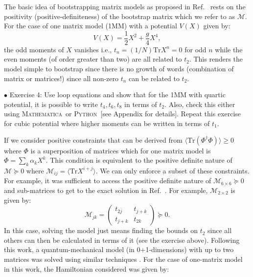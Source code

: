 \documentclass[letter,11pt]{article}
\newcommand{\MA}{\textsc{Mathematica}}
\newcommand{\PY}{\textsc{Python}}
\begin{document}
The basic idea of bootstrapping matrix models as proposed in Ref.~\cite{Lin:2020mme} rests on the 
positivity (positive-definiteness) of the bootstrap matrix which we refer to as $\mathcal{M}$. 
For the case of one matrix model (1MM) with a potential $V(X)$ given by: 
\begin{equation}
    V(X) = \frac12 X^2 + \frac{g}{4} X^4, 
\end{equation}
the odd moments of $X$ vanishes i.e., $ t_{n} = (1/N)\mbox{Tr} X^n = 0$ for odd $n$
while the even moments (of order greater than two) are all related to $t_{2}$. This renders the 
model simple to bootstrap since there is no growth of words (combination of matrix or matrices!)
since all non-zero $t_{n}$ can be related to $t_{2}$. 
\begin{mdframed}[backgroundcolor=blue!3] 
	$\bullet$ Exercise 4: Use loop equations and show that for the 1MM with quartic potential, it is possible to write $t_{4}, t_{6}, t_{8}$ in terms of $t_{2}$. Also, check this either using \MA~or  \PY~[see Appendix for details]. 
Repeat this exercise for cubic potential where higher moments can be written in terms of $t_1$.  
\end{mdframed} 
If we consider positive constraints that can be derived from $\langle \mbox{Tr}(\Phi^{\dagger}\Phi) \rangle \ge 0 $
where $\Phi$ is a superposition of matrices which for one matrix model is 
$ \Phi = \sum_{k} \alpha_{k} X^{k}$. This condition is equivalent to the positive definite nature of
$\mathcal{M} \succeq 0 $ where $ \mathcal{M}_{ij} = \langle \mbox{Tr} X^{i+j} \rangle$. 
We can only enforce a subset of these constraints. For example, it was sufficient to 
access the positive definite nature of $\mathcal{M}_{6 \times 6} \succeq 0 $ 
and sub-matrices to get to the exact solution in Ref.~\cite{Lin:2020mme}. 
For example, $\mathcal{M}_{2 \times 2}$ is given by:
\begin{equation}
	\mathcal{M}_{jk} = 
	\begin{pmatrix}
		t_{2j} & t_{j+k}  \\
		t_{j+k} & t_{2k}  
	\end{pmatrix}  \succeq 0. 
\end{equation}
In this case, solving the model just means finding the bounds on $t_{2}$ 
since all others can then be calculated in terms of it (see the exercise above). 
Following this work, a quantum-mechanical 
model (in 0+1-dimensions) with up to two matrices was solved using similar techniques \cite{Han:2020bkb}.  
For the case of one-matrix model in this work, the Hamiltonian considered was given by:
\end{document}
